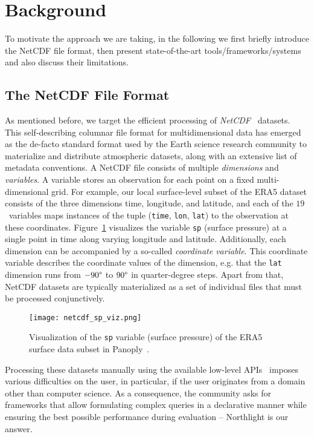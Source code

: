 \documentclass[conference]{IEEEtran}
\newcommand{\system}{Northlight}
\newcommand{\smalltt}[1]{{\texttt{\small #1}}}
\begin{document}
\section{Background}
\label{sec:background}

To motivate the approach we are taking, in the following we first briefly introduce the NetCDF file format, then present state-of-the-art tools/frameworks/systems and also discuss their limitations.

\subsection{The NetCDF File Format}
\label{sec:system:problem:netcdf}

As mentioned before, we target the efficient processing of \textit{NetCDF}~\cite{lit:netcdf} datasets. This self-describing columnar file format for multidimensional data has emerged as the de-facto standard format used by the Earth science research community to materialize and distribute atmospheric datasets, along with an extensive list of metadata conventions\cite{lit:convention,lit:convention-monotonic}.
A NetCDF file consists of multiple \textit{dimensions} and \textit{variables}. A variable stores an observation for each point on a fixed multi-dimensional grid. For example, our local surface-level subset of the ERA5 dataset consists of the three dimensions time, longitude, and latitude, and each of the $19$~variables maps instances of the tuple (\smalltt{time}, \smalltt{lon}, \smalltt{lat}) to the observation at these coordinates. Figure~\ref{fig:netcdf_viz} visualizes the variable \smalltt{sp} (surface pressure) at a single point in time along varying longitude and latitude. Additionally, each dimension can be accompanied by a so-called \textit{coordinate variable}. This coordinate variable describes the coordinate values of the dimension, e.g. that the \smalltt{lat} dimension runs from $-90\degree$ to $90\degree$ in quarter-degree steps.
Apart from that, NetCDF datasets are typically materialized as a set of individual files that must be processed conjunctively. 

\begin{figure}[h!]
\texttt{[image: netcdf\_sp\_viz.png]}
\caption{Visualization of the \smalltt{sp} variable (surface pressure) of the ERA5 surface data subset in Panoply~\cite{lit:panoply}.}
\label{fig:netcdf_viz}
\end{figure}

Processing these datasets manually using the available low-level APIs~\cite{lit:netcdf-java,lit:netcdf-python,lit:xarray} imposes various difficulties on the user, in particular, if the user originates from a domain other than computer science. As a consequence, the community asks for frameworks that allow formulating complex queries in a declarative manner while ensuring the best possible performance during evaluation -- \system{} is our answer.
\end{document}
